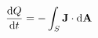 \documentclass[preview]{standalone}
\begin{document}
\begin{align*}
\dv{Q}{t} = -\int_S \textbf{J}\cdot \text{d}\textbf{A}
\end{align*}
\end{document}
